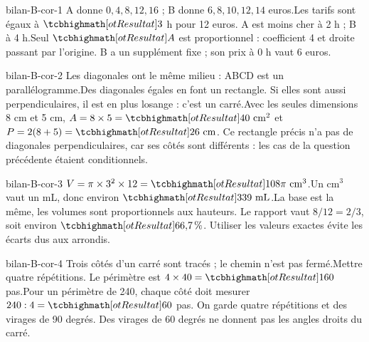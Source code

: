 \begin{blocEdition}{bilan-B-cor-1}
A donne $0,4,8,12,16$ ; B donne $6,8,10,12,14$ euros.Les tarifs sont égaux à $\res3$ h pour 12 euros. A est moins cher à 2 h ; B à 4 h.Seul $\res A$ est proportionnel : coefficient 4 et droite passant par l’origine. B a un supplément fixe ; son prix à 0 h vaut 6 euros.\label{fig-bilan-B-cor-1}

\end{blocEdition}
\begin{blocEdition}{bilan-B-cor-2}
Les diagonales ont le même milieu : ABCD est un parallélogramme.Des diagonales égales en font un rectangle. Si elles sont aussi perpendiculaires, il est en plus losange : c’est un carré.Avec les seules dimensions 8 cm et 5 cm, $A=8\times5=\res{40\ \mathrm{cm}^2}$ et $P=2(8+5)=\res{26\ \mathrm{cm}}$. Ce rectangle précis n’a pas de diagonales perpendiculaires, car ses côtés sont différents : les cas de la question précédente étaient conditionnels.\label{fig-bilan-B-cor-2}

\end{blocEdition}
\begin{blocEdition}{bilan-B-cor-3}
$V=\pi\times3^2\times12=\res{108\pi\ \mathrm{cm}^3}$.Un cm$^3$ vaut un mL, donc environ $\res{339\ \mathrm{mL}}$.La base est la même, les volumes sont proportionnels aux hauteurs. Le rapport vaut $8/12=2/3$, soit environ $\res{66{,}7\,\%}$. Utiliser les valeurs exactes évite les écarts dus aux arrondis.\label{fig-bilan-B-cor-3}

\end{blocEdition}
\begin{blocEdition}{bilan-B-cor-4}
Trois côtés d’un carré sont tracés ; le chemin n’est pas fermé.Mettre quatre répétitions. Le périmètre est $4\times40=\res{160}$ pas.Pour un périmètre de 240, chaque côté doit mesurer $240:4=\res{60}$ pas. On garde quatre répétitions et des virages de 90 degrés. Des virages de 60 degrés ne donnent pas les angles droits du carré.\label{fig-bilan-B-cor-4}

\end{blocEdition}
